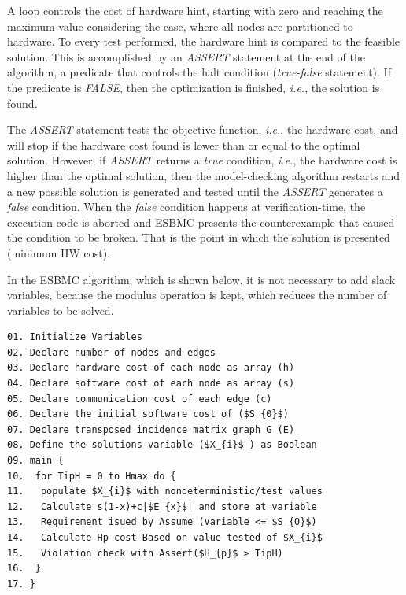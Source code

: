 A loop controls the cost of hardware hint, starting with zero and reaching the maximum value considering the case, where all nodes are partitioned to hardware. To every test performed, the hardware hint is compared to the feasible solution. This is accomplished by an \textit{ASSERT} statement at the end of the algorithm, a predicate that controls the halt condition (\textit{true-false} statement). If the predicate is \textit{FALSE}, then the optimization is finished, {\it i.e.}, the solution is found. 

The \textit{ASSERT} statement tests the objective function, {\it i.e.}, the hardware cost, and will stop if the hardware cost found is lower than or equal to the optimal solution. However, if \textit{ASSERT} returns a \textit{true} condition, {\it i.e.}, the hardware cost is higher than the optimal solution, then the model-checking algorithm restarts and a new possible solution is generated and tested until the \textit{ASSERT} generates a \textit{false} condition. When the \textit{false} condition happens at verification-time, the execution code is aborted and ESBMC presents the counterexample that caused the condition to be broken. That is the point in which the solution is presented (minimum HW cost).

In the ESBMC algorithm, which is shown below, it is not necessary to add slack variables, because the modulus operation is kept, which reduces the number of variables to be solved. 

\begin{lstlisting}[caption=Pseudocode describing ESBMC, mathescape]
01. Initialize Variables 
02. Declare number of nodes and edges
03. Declare hardware cost of each node as array (h)
04. Declare software cost of each node as array (s)
05. Declare communication cost of each edge (c)
06. Declare the initial software cost of ($S_{0}$)
07. Declare transposed incidence matrix graph G (E)
08. Define the solutions variable ($X_{i}$ ) as Boolean
09. main {
10.  for TipH = 0 to Hmax do {
11.   populate $X_{i}$ with nondeterministic/test values
12.   Calculate s(1-x)+c|$E_{x}$| and store at variable
13.   Requirement isued by Assume (Variable <= $S_{0}$)
14.   Calculate Hp cost Based on value tested of $X_{i}$
15.   Violation check with Assert($H_{p}$ > TipH)
16.  }
17. }
\end{lstlisting}


